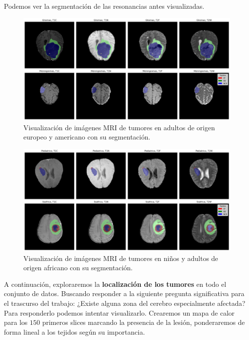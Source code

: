 Podemos ver la segmentación de las resonancias antes visualizadas.
\begin{figure}[!h]
	\centering
	\includegraphics[width=1.1\linewidth]{imagenes/segimagenesMRI.png}
	\caption{Visualización de imágenes MRI de tumores en adultos de origen europeo y americano con su segmentación.}
\end{figure}

\begin{figure}[!h]
	\centering
	\includegraphics[width=1.1\linewidth]{imagenes/segimagenesSSAPEDMRI.png}
	\caption{Visualización de imágenes MRI de tumores en niños y adultos de origen africano con su segmentación.}
\end{figure}

\newpage
A continuación, exploraremos la \textbf{localización de los tumores} en todo el conjunto de datos. Buscando responder a la siguiente pregunta significativa para el trascurso del trabajo: ¿Existe alguna zona del cerebro especialmente afectada? Para responderlo podemos intentar visualizarlo. Crearemos un mapa de calor para los $150$ primeros slices marcando la presencia de la lesión, ponderaremos de forma lineal a los tejidos según su importancia.

